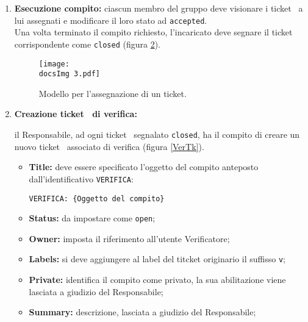 {{\begin{enumerate}
		\begin{center}
			\begin{figure}[h]
				\centering
				\label{CreaTk}
				\texttt{[image: \\docsImg 2.pdf]}
				\caption{Modello per la creazione di un nuovo ticket\g.}	
			\end{figure}
		\end{center}
		
		\item \textbf{Esecuzione compito:} \label{esecuzioneTicket} {
			ciascun membro del gruppo deve visionare i ticket\g~ a lui assegnati e modificare il loro stato ad \texttt{accepted}.\\
			Una volta terminato il compito richiesto, l'incaricato deve segnare il ticket\g~ corrispondente come \texttt{closed} (figura \ref{AssTk}).	
		}

		\begin{center}
			\begin{figure}[h]
				\centering
				\label{AssTk}
				\texttt{[image: \\docsImg 3.pdf]}
				\caption{Modello per l'assegnazione di un ticket\g.}	
			\end{figure}
		\end{center}

		\item \textbf{Creazione ticket\g~ di verifica:} \label{creazioneTicketVer} {
			il Responsabile, ad ogni ticket\g~ segnalato \texttt{closed}, ha il compito di creare un nuovo ticket\g~ associato di verifica (figura \ref{VerTk}).
			\begin{itemize}
				\item \textbf{Title:} deve essere specificato l'oggetto del compito anteposto dall'identificativo \texttt{VERIFICA}:
				\begin{center}
					\texttt{VERIFICA: \{Oggetto del compito\}}
				\end{center}
				\item \textbf{Status:} da impostare come \texttt{open};
				\item \textbf{Owner:} imposta il riferimento all'utente Verificatore;
				\item \textbf{Labels:} si deve aggiungere al label del titcket originario il suffisso \texttt{v};
				\item \textbf{Private:} identifica il compito come privato, la sua abilitazione viene lasciata a giudizio del Responsabile;
				\item \textbf{Summary:} descrizione, lasciata a giudizio del Responsabile;
			\end{itemize}			
		}
		

\end{enumerate}}}
